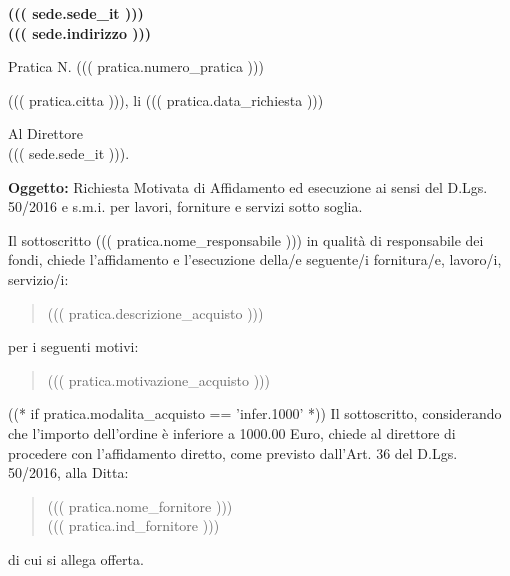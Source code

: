 \documentclass[a4paper,12pt]{letter}
\begin{document}
\vspace{-2.5cm}
\begin{center}
\small \bf
((( sede.sede_it ))) \\
((( sede.indirizzo )))
\end{center}
\thispagestyle{empty}
\vspace{1cm}

{\small Pratica N. ((( pratica.numero_pratica ))) }
\vspace{1cm}

\begin{flushright}
((( pratica.citta ))), li ((( pratica.data_richiesta ))) 
\end{flushright}
\vspace{1cm}

Al Direttore \\
((( sede.sede_it ))).
\vspace{0.5cm}
	 
{\bf Oggetto:} Richiesta Motivata di Affidamento ed esecuzione ai sensi del D.Lgs. 50/2016 e s.m.i.
per lavori, forniture e servizi sotto soglia.

\vspace{0.5cm}

Il sottoscritto ((( pratica.nome_responsabile ))) in qualità di 
responsabile dei fondi, chiede l'affidamento e l'esecuzione della/e
seguente/i fornitura/e, lavoro/i, servizio/i:

\begin{quote}

((( pratica.descrizione_acquisto )))
\end{quote}

per i seguenti motivi:

\begin{quote}
((( pratica.motivazione_acquisto )))
\end{quote}

((* if pratica.modalita_acquisto == 'infer.1000' *))
Il sottoscritto, considerando che l'importo dell'ordine è inferiore a 1000.00 Euro,
chiede al direttore di procedere con l'affidamento diretto,
come previsto dall'Art. 36 del D.Lgs. 50/2016, alla Ditta: 
\begin{quote}
((( pratica.nome_fornitore )))\\
((( pratica.ind_fornitore )))
\end{quote}

di cui si allega offerta.
\end{document}
